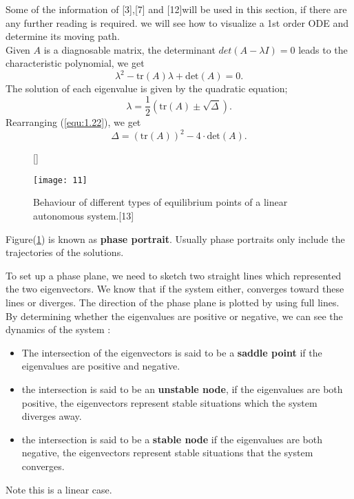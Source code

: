 \documentclass[a4paper]{report}
\theoremstyle{definition}
\begin{document}
Some of the information of [3],[7] and [12]will be used in this section, if there are any further reading is required.
we will see how to visualize a 1st order ODE and determine its moving path. 
\\
Given $A$ is a diagnosable matrix, the determinant $det(A-\lambda I)=0$ leads to the characteristic polynomial, we get
\begin{equation}
 \lambda^2-\text{tr}(A)\lambda+\text{det}(A)=0.
\end{equation}
The solution of each eigenvalue is given by the quadratic equation;
\begin{equation}
\label{equ:1.22}
\lambda=\dfrac{1}{2}(\text{tr}(A)\pm \sqrt{\Delta}).
\end{equation}
Rearranging (\ref{equ:1.22}), we get
\begin{equation}
\Delta=(\text{tr}(A))^2-4 \cdot \text{det}(A).
\end{equation}
\begin{figure}[H]
\centering
{}[\FBwidth]
{\caption{Behaviour of different types of equilibrium points of a linear autonomous system.[13]}\label{fig:tet1}}
{\texttt{[image: 11]}}
\end{figure}

Figure(\ref{fig:tet1}) is known as \textbf{phase portrait}.  Usually phase portraits only include the trajectories of the solutions.

To set up a phase plane, we need to sketch two straight lines which represented the two eigenvectors. We know that if the system either, converges toward these lines or diverges. The direction of the phase plane is plotted by using full lines. By determining whether the eigenvalues are positive or negative, we can see the dynamics of the system :
\begin{itemize}
  \item The intersection of the eigenvectors is said to be a \textbf{saddle point} if the eigenvalues are positive and negative.
  \item the intersection is said to be an \textbf{unstable node}, if the eigenvalues are both positive, the eigenvectors represent stable situations which the system diverges away.
  \item the intersection is said to be a \textbf{stable node} if the eigenvalues are both negative, the eigenvectors represent stable situations that the system converges.
\end{itemize}
Note this is a linear case.
\end{document}
